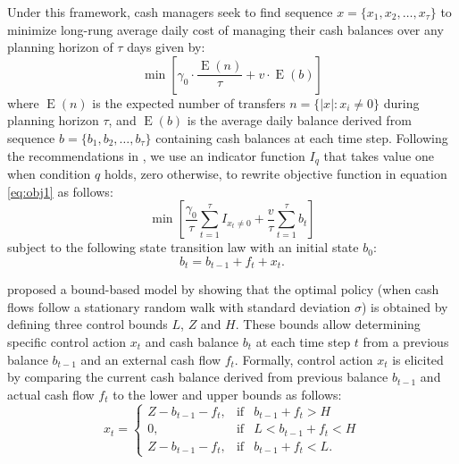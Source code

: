 Under this framework, cash managers seek to find sequence $x=\{x_1, x_2, \ldots, x_\tau\}$ to minimize long-rung average daily cost of managing their cash balances over any planning horizon of $\tau$ days given by:
\begin{equation}
\operatorname{min} \left[ \gamma_0 \cdot \frac{\operatorname{E}(n)}{\tau} + v \cdot \operatorname{E}(b)\right]
\label{eq:obj1}
\end{equation}
where $\operatorname{E}(n)$ is the expected number of transfers $n=\{|x|:x_i \neq 0\}$ during planning horizon $\tau$, and $\operatorname{E}(b)$ is the average daily balance derived from sequence $b=\{b_1, b_2, \ldots, b_\tau \}$ containing cash balances at each time step. Following the recommendations in \cite{gormley2007utility}, we use an indicator function $I_q$ that takes value one when condition $q$ holds, zero otherwise, to rewrite objective function in equation \eqref{eq:obj1} as follows:
\begin{equation}
\operatorname{min} \left[ \frac{\gamma_0}{\tau} \sum_{t=1}^\tau{I_{x_t \neq 0}}  +\frac{v}{\tau} \sum_{t=1}^\tau {b_t} \right]
\label{eq:obj2}
\end{equation}
subject to the following state transition law with an initial state $b_0$:
\begin{equation}
b_t = b_{t-1} + f_t + x_t.   
\label{eq:cont}
\end{equation}

\cite{miller1966model} proposed a bound-based model by showing that the optimal policy (when cash flows follow a stationary random walk with standard deviation $\sigma$) is obtained by defining three control bounds $L$, $Z$ and $H$. These bounds allow determining specific control action $x_t$ and cash balance $b_t$ at each time step $t$ from a previous balance $b_{t-1}$ and an external cash flow $f_t$. Formally, control action $x_t$ is elicited by comparing the current cash balance derived from previous balance $b_{t-1}$ and actual cash flow $f_t$ to the lower and upper bounds as follows:
\begin{equation}
x_t =\left\{\begin{array}{lll}Z-b_{t-1}-f_t, & \mbox{if} & b_{t-1}+f_t  > H \\ 0, &\mbox{if} & L<b_{t-1}+f_t < H  \\Z-b_{t-1}-f_t, & \mbox{if} & b_{t-1}+f_t < L. \end{array}\right.
\label{eq:TransferMiller}
\end{equation}


